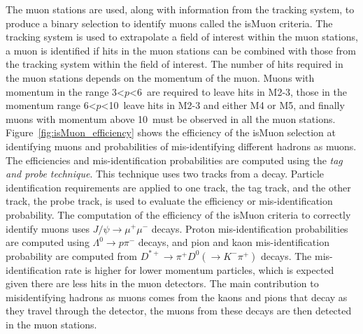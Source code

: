 The muon stations are used, along with information from the tracking system, to produce a binary selection to identify muons called the isMuon criteria. The tracking system is used to extrapolate a field of interest within the muon stations, a muon is identified if hits in the muon stations can be combined with those from the tracking system within the field of interest. The number of hits required in the muon stations depends on the momentum of the muon. Muons with momentum in the range 3<$p$<6~\gevc are required to leave hits in M2-3, those in the momentum range 6<$p$<10~\gevc leave hits in M2-3 and either M4 or M5, and finally muons with momentum above 10~\gevc must be observed in all the muon stations. Figure~\ref{fig:isMuon_efficiency} shows the efficiency of the isMuon selection at identifying muons and probabilities of mis-identifying different hadrons as muons. The efficiencies and mis-identification probabilities are computed using the {\it tag and probe technique}. This technique uses two tracks from a decay. Particle identification requirements are applied to one track, the tag track, and the other track, the probe track, is used to evaluate the efficiency or mis-identification probability. The computation of the efficiency of the isMuon criteria to correctly identify muons uses $J/\psi \to \mu^+ \mu^-$ decays. Proton mis-identification probabilities are computed using $\Lambda^0 \to p \pi^-$ decays, and pion and kaon mis-identification probability are computed from $D^{*+} \to \pi^+ D^0 (\to K^- \pi^+)$ decays. The mis-identification rate is higher for lower momentum particles, which is expected given there are less hits in the muon detectors. The main contribution to misidentifying hadrons as muons comes from the kaons and pions that decay as they travel through the detector, the muons from these decays are then detected in the muon stations.


